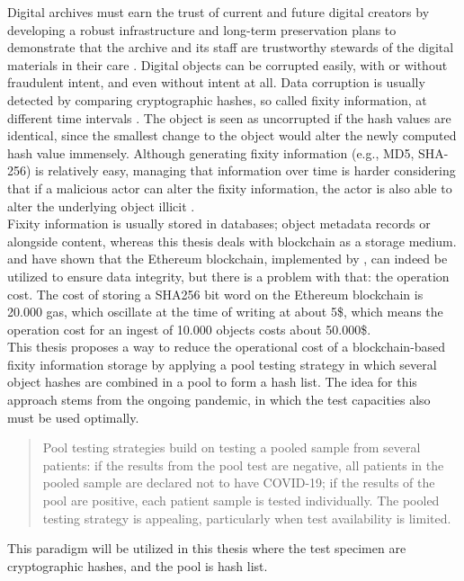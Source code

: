 Digital archives must earn the trust of current and future digital creators by developing a robust infrastructure and long-term preservation plans to demonstrate that the archive and its staff are trustworthy stewards of the digital materials in their care \cite[37]{kirschenbaum2010digital}. Digital objects can be corrupted easily, with or without fraudulent intent, and even without intent at all. Data corruption is usually detected by comparing cryptographic hashes, so called fixity information, at different time intervals \cite[1]{de2014checking}. The object is seen as uncorrupted if the hash values are identical, since the smallest change to the object would alter the newly computed hash value immensely. Although generating fixity information (e.g., MD5, SHA-256) is relatively easy, managing that information over time is harder considering that if a malicious actor can alter the fixity information, the actor is also able to alter the underlying object illicit \cite[35]{kirschenbaum2010digital}.\\Fixity information is usually stored in databases; object metadata records or alongside content, whereas this thesis deals with blockchain as a storage medium. \cite{collomosse2018archangel} and \cite{Sigwart2020} have shown that the Ethereum blockchain, implemented by \cite{buterin2013ethereum}, can indeed be utilized to ensure data integrity, but there is a problem with that: the operation cost. The cost of storing a SHA256 bit word on the Ethereum blockchain is 20.000 gas, which oscillate at the time of writing at about 5\$, which means the operation cost for an ingest of 10.000 objects costs about 50.000\$.\\
This thesis proposes a way to reduce the operational cost of a blockchain-based fixity information storage by applying a pool testing strategy in which several object hashes are combined in a pool to form a hash list.
The idea for this approach stems from the ongoing pandemic, in which the test capacities also must be used optimally.
\begin{quote}
Pool testing strategies build on testing a pooled sample from several patients: if the results from
the pool test are negative, all patients in the pooled sample are declared not to have COVID-19; if the
results of the pool are positive, each patient sample is tested individually. The pooled testing strategy
is appealing, particularly when test availability is limited. \cite[1]{cherif2020simulation}
\end{quote}
This paradigm will be utilized in this thesis where the test specimen are cryptographic hashes, and the pool is hash list.
